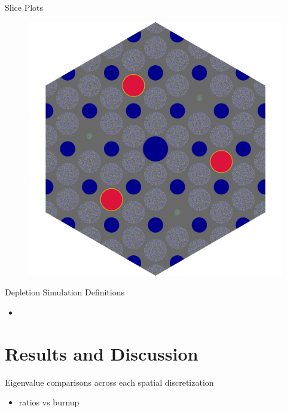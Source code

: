 \documentclass[9pt,t,aspectratio=169]{beamer}
\begin{document}
\begin{frame}{Slice Plots}
    \begin{figure}
        \includegraphics[height=0.8\textheight]{figures/gcmr_slice.png}
    \end{figure}
\end{frame}


\begin{frame}{Depletion Simulation Definitions}
    \begin{itemize}
        \item
    \end{itemize}
\end{frame}

\section{Results and Discussion}

\begin{frame}{Eigenvalue comparisons across each spatial discretization}
    \begin{itemize}
        \item ratios vs burnup
    \end{itemize}
\end{frame}
\end{document}

